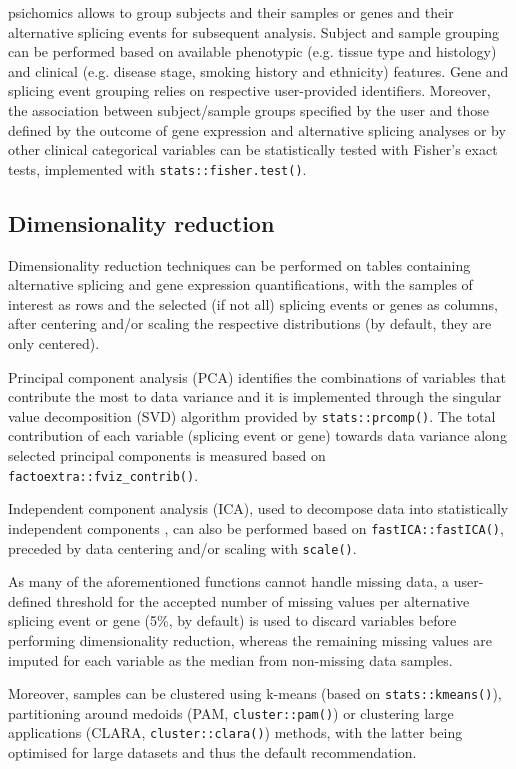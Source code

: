 psichomics allows to group subjects and their samples or genes and their alternative splicing events for subsequent analysis. Subject and sample grouping can be performed based on available phenotypic (e.g. tissue type and histology) and clinical (e.g. disease stage, smoking history and ethnicity) features. Gene and splicing event grouping relies on respective user-provided identifiers. Moreover, the association between subject/sample groups specified by the user and those defined by the outcome of gene expression and alternative splicing analyses or by other clinical categorical variables can be statistically tested with Fisher's exact tests, implemented with \texttt{stats::fisher.test()}.

\subsection{Dimensionality reduction}
\label{subsec:psichomics-pca}

Dimensionality reduction techniques can be performed on tables containing alternative splicing and gene expression quantifications, with the samples of interest as rows and the selected (if not all) splicing events or genes as columns, after centering and/or scaling the respective distributions (by default, they are only centered).

Principal component analysis (PCA) identifies the combinations of variables that contribute the most to data variance \cite{ringner:2008ve} and it is implemented through the singular value decomposition (SVD) algorithm provided by \texttt{stats::prcomp()}. The total contribution of each variable (splicing event or gene) towards data variance along selected principal components is measured based on \texttt{factoextra::fviz\_contrib()}.

Independent component analysis (ICA), used to decompose data into statistically independent components \cite{hyvarinen:2000vk}, can also be performed based on \texttt{fastICA::fastICA()}, preceded by data centering and/or scaling with \texttt{scale()}.

As many of the aforementioned functions cannot handle missing data, a user-defined threshold for the accepted number of missing values per alternative splicing event or gene (5\%, by default) is used to discard variables before performing dimensionality reduction, whereas the remaining missing values are imputed for each variable as the median from non-missing data samples.

Moreover, samples can be clustered using k-means (based on \texttt{stats::kmeans()}), partitioning around medoids (PAM, \texttt{cluster::pam()}) or clustering large applications (CLARA, \texttt{cluster::clara()}) methods, with the latter being optimised for large datasets and thus the default recommendation.

